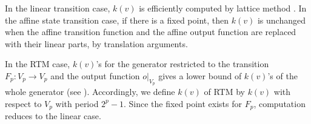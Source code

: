 \documentclass{svmult}
\def\bbf2{\ifmmode\mathbb{F}_2\else$\mathbb{F}_2$\fi}%
\begin{document}
In the linear transition case, $k(v)$ is
efficiently computed by lattice method \cite{CLT}.
In the affine state transition case, if there is a
fixed point, then $k(v)$ is unchanged when
the affine transition function 
and the affine output function are replaced with their linear parts,
by translation arguments.

In the RTM case, $k(v)$'s for the generator restricted to 
the transition $F_p: V_p \to V_p$ and the output
function $o|_{V_p}$ gives a lower bound of $k(v)$'s of the 
whole generator (see \cite{SFMT}). Accordingly, we define $k(v)$ of
RTM by $k(v)$ with respect to $V_p$ with period $2^p-1$. 
Since the fixed point exists for $F_p$, computation reduces to the linear case.




\end{document}
